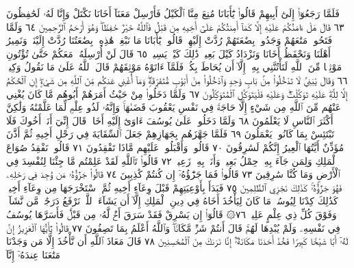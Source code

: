 فَلَمَّا رَجَعُوٓا۟ إِلَىٰٓ أَبِيهِمْ قَالُوا۟ يَٰٓأَبَانَا مُنِعَ مِنَّا ٱلْكَيْلُ
فَأَرْسِلْ مَعَنَآ أَخَانَا نَكْتَلْ وَإِنَّا لَهُۥ لَحَٰفِظُونَ ٦٣
قَالَ هَلْ ءَامَنُكُمْ عَلَيْهِ إِلَّا كَمَآ أَمِنتُكُمْ عَلَىٰٓ أَخِيهِ مِن
قَبْلُ فَٱللَّهُ خَيْرٌ حَٰفِظࣰاۖ وَهُوَ أَرْحَمُ ٱلرَّٰحِمِينَ ٦٤ وَلَمَّا فَتَحُوا۟
مَتَٰعَهُمْ وَجَدُوا۟ بِضَٰعَتَهُمْ رُدَّتْ إِلَيْهِمْۖ قَالُوا۟ يَٰٓأَبَانَا
مَا نَبْغِيۖ هَٰذِهِۦ بِضَٰعَتُنَا رُدَّتْ إِلَيْنَاۖ وَنَمِيرُ أَهْلَنَا وَنَحْفَظُ
أَخَانَا وَنَزْدَادُ كَيْلَ بَعِيرࣲۖ ذَٰلِكَ كَيْلࣱ يَسِيرࣱ ٦٥ قَالَ
لَنْ أُرْسِلَهُۥ مَعَكُمْ حَتَّىٰ تُؤْتُونِ مَوْثِقࣰا مِّنَ ٱللَّهِ لَتَأْتُنَّنِي
بِهِۦٓ إِلَّآ أَن يُحَاطَ بِكُمْۖ فَلَمَّآ ءَاتَوْهُ مَوْثِقَهُمْ قَالَ ٱللَّهُ عَلَىٰ مَا
نَقُولُ وَكِيلࣱ ٦٦ وَقَالَ يَٰبَنِيَّ لَا تَدْخُلُوا۟ مِنۢ بَابࣲ وَٰحِدࣲ
وَٱدْخُلُوا۟ مِنْ أَبْوَٰبࣲ مُّتَفَرِّقَةࣲۖ وَمَآ أُغْنِي عَنكُم مِّنَ ٱللَّهِ مِن
شَيْءٍۖ إِنِ ٱلْحُكْمُ إِلَّا لِلَّهِۖ عَلَيْهِ تَوَكَّلْتُۖ وَعَلَيْهِ فَلْيَتَوَكَّلِ
ٱلْمُتَوَكِّلُونَ ٦٧ وَلَمَّا دَخَلُوا۟ مِنْ حَيْثُ أَمَرَهُمْ أَبُوهُم مَّا كَانَ
يُغْنِي عَنْهُم مِّنَ ٱللَّهِ مِن شَيْءٍ إِلَّا حَاجَةࣰ فِي نَفْسِ يَعْقُوبَ
قَضَىٰهَاۚ وَإِنَّهُۥ لَذُو عِلْمࣲ لِّمَا عَلَّمْنَٰهُ وَلَٰكِنَّ أَكْثَرَ ٱلنَّاسِ
لَا يَعْلَمُونَ ٦٨ وَلَمَّا دَخَلُوا۟ عَلَىٰ يُوسُفَ ءَاوَىٰٓ إِلَيْهِ أَخَاهُۖ
قَالَ إِنِّيٓ أَنَا۠ أَخُوكَ فَلَا تَبْتَئِسْ بِمَا كَانُوا۟ يَعْمَلُونَ ٦٩
فَلَمَّا جَهَّزَهُم بِجَهَازِهِمْ جَعَلَ ٱلسِّقَايَةَ فِي رَحْلِ أَخِيهِ
ثُمَّ أَذَّنَ مُؤَذِّنٌ أَيَّتُهَا ٱلْعِيرُ إِنَّكُمْ لَسَٰرِقُونَ ٧٠ قَالُوا۟
وَأَقْبَلُوا۟ عَلَيْهِم مَّاذَا تَفْقِدُونَ ٧١ قَالُوا۟ نَفْقِدُ صُوَاعَ ٱلْمَلِكِ
وَلِمَن جَآءَ بِهِۦ حِمْلُ بَعِيرࣲ وَأَنَا۠ بِهِۦ زَعِيمࣱ ٧٢ قَالُوا۟ تَٱللَّهِ
لَقَدْ عَلِمْتُم مَّا جِئْنَا لِنُفْسِدَ فِي ٱلْأَرْضِ وَمَا كُنَّا سَٰرِقِينَ ٧٣
قَالُوا۟ فَمَا جَزَٰٓؤُهُۥٓ إِن كُنتُمْ كَٰذِبِينَ ٧٤ قَالُوا۟ جَزَٰٓؤُهُۥ
مَن وُجِدَ فِي رَحْلِهِۦ فَهُوَ جَزَٰٓؤُهُۥۚ كَذَٰلِكَ نَجْزِي ٱلظَّٰلِمِينَ ٧٥
فَبَدَأَ بِأَوْعِيَتِهِمْ قَبْلَ وِعَآءِ أَخِيهِ ثُمَّ ٱسْتَخْرَجَهَا مِن
وِعَآءِ أَخِيهِۚ كَذَٰلِكَ كِدْنَا لِيُوسُفَۖ مَا كَانَ لِيَأْخُذَ أَخَاهُ
فِي دِينِ ٱلْمَلِكِ إِلَّآ أَن يَشَآءَ ٱللَّهُۚ نَرْفَعُ دَرَجَٰتࣲ مَّن نَّشَآءُۗ
وَفَوْقَ كُلِّ ذِي عِلْمٍ عَلِيمࣱ ٧٦۞ قَالُوٓا۟ إِن يَسْرِقْ
فَقَدْ سَرَقَ أَخࣱ لَّهُۥ مِن قَبْلُۚ فَأَسَرَّهَا يُوسُفُ فِي نَفْسِهِۦ
وَلَمْ يُبْدِهَا لَهُمْۚ قَالَ أَنتُمْ شَرࣱّ مَّكَانࣰاۖ وَٱللَّهُ أَعْلَمُ بِمَا
تَصِفُونَ ٧٧ قَالُوا۟ يَٰٓأَيُّهَا ٱلْعَزِيزُ إِنَّ لَهُۥٓ أَبࣰا شَيْخࣰا كَبِيرࣰا
فَخُذْ أَحَدَنَا مَكَانَهُۥٓۖ إِنَّا نَرَىٰكَ مِنَ ٱلْمُحْسِنِينَ ٧٨
قَالَ مَعَاذَ ٱللَّهِ أَن نَّأْخُذَ إِلَّا مَن وَجَدْنَا مَتَٰعَنَا عِندَهُۥٓ إِنَّآ
